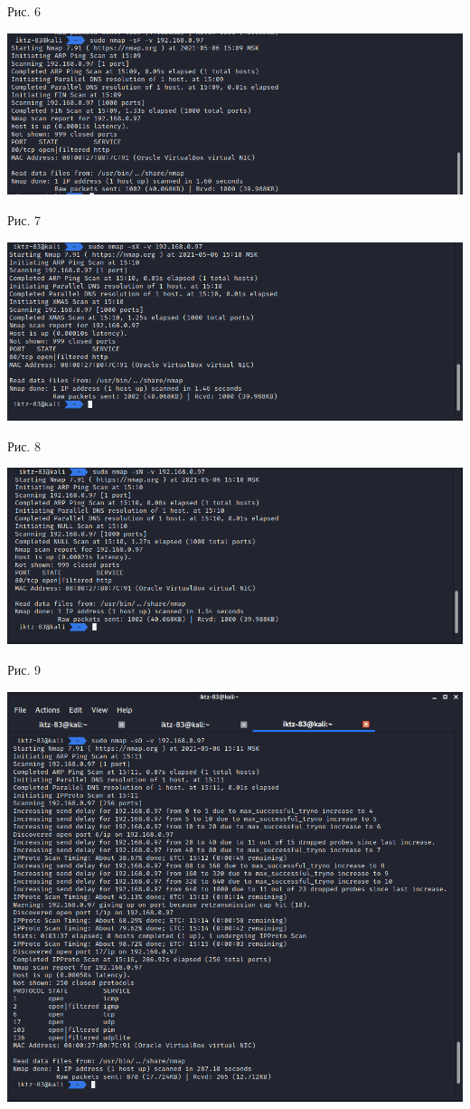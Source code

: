 \documentclass[a4paper,14pt]{extarticle}
\begin{document}
\begin{center}
        Рис. 6

        \includegraphics[scale=0.5]{pics/6.png}

        Рис. 7

        \includegraphics[scale=0.5]{pics/7.png}

        Рис. 8

        \includegraphics[scale=0.5]{pics/8.png}

        Рис. 9

        \includegraphics[scale=0.5]{pics/9.png}


\end{center}
\end{document}
